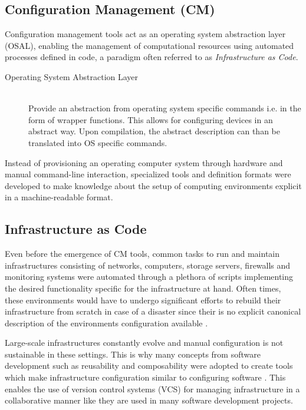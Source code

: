\subsection{Configuration Management (CM)}

Configuration management tools act as an operating system abstraction layer (OSAL), enabling the management of computational resources using automated processes defined in code, a paradigm often referred to as \textit{Infrastructure as Code}.

\begin{description}
	\item [Operating System Abstraction Layer] \hfill \\
	Provide an abstraction from operating system specific commands i.e. in the form of wrapper functions. This allows for configuring devices in an abstract way. Upon compilation, the abstract description can than be translated into OS specific commands.
\end{description}

Instead of provisioning an operating computer system through hardware and manual command-line interaction, specialized tools and definition formats were developed to make knowledge about the setup of computing environments explicit in a machine-readable format.

\subsection{Infrastructure as Code}

Even before the emergence of CM tools, common tasks to run and maintain infrastructures consisting of networks, computers, storage servers, firewalls and monitoring systems were automated through a plethora of scripts implementing the desired functionality specific for the infrastructure at hand. Often times, these environments would have to undergo significant efforts to rebuild their infrastructure from scratch in case of a disaster since their is no explicit canonical description of the environments configuration available \cite{Hüttermann2012}.

Large-scale infrastructures constantly evolve and manual configuration is not sustainable in these settings. This is why many concepts from software development such as reusability and composability were adopted to create tools which make infrastructure configuration similar to configuring software \cite{kanies2006puppet}. This enables the use of version control systems (VCS) for managing infrastructure in a collaborative manner like they are used in many software development projects.

